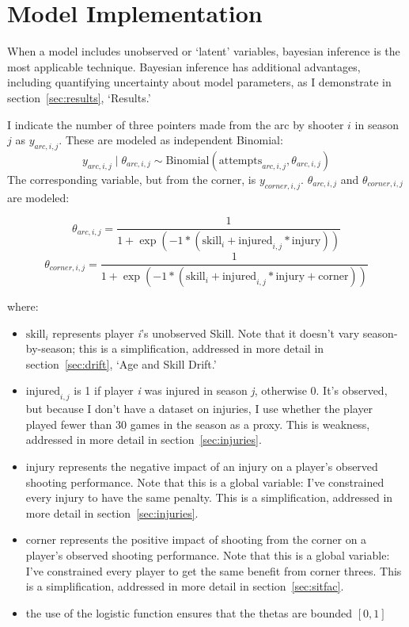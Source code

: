 \documentclass[11pt, oneside]{article}   	%
\begin{document}
\section{Model Implementation}
When a model includes unobserved or `latent' variables, bayesian inference is the most applicable technique.  Bayesian inference has additional advantages, including quantifying uncertainty about model parameters, as I demonstrate in section~\ref{sec:results}, `Results.' 

I indicate the number of three pointers made from the arc by shooter \(i\) in season \(j\) as \(y_{arc, i, j}\).  
These are modeled as independent Binomial:
\begin{displaymath}
y_{arc, i, j}  \mid  \theta_{arc, i, j} \sim \text{Binomial}(\text{attempts}_{arc, i, j},  \theta_{arc, i, j})
\end{displaymath} 
The corresponding variable, but from the corner, is \(y_{corner, i, j}\). \(\theta_{arc, i, j}\) and  \(\theta_{corner, i, j}\) are modeled:


\begin{displaymath}
\theta_{arc, i, j} = \frac{1}{1 + \exp(-1 * (\text{skill}_i + \text{injured}_{i,j}*\text{injury}))}
\end{displaymath} 
\begin{displaymath}
\theta_{corner, i, j} = \frac{1}{1 + \exp(-1 * (\text{skill}_i + \text{injured}_{i,j}*\text{injury} + \text{corner} ))}
\end{displaymath} 

where:
\begin{itemize}
\item \(\text{skill}_i\) represents player \textit{i}'s unobserved Skill.  Note that it doesn't vary season-by-season; this is a simplification, addressed in more detail in section~\ref{sec:drift}, `Age and Skill Drift.'
\item \(\text{injured}_{i,j}\) is 1 if player \textit{i} was injured in season \textit{j}, otherwise 0. It's observed, but because I don't have a dataset on injuries, I use whether the player played fewer than 30 games in the season as a proxy.  This is weakness, addressed in more detail in section~\ref{sec:injuries}.
\item injury represents the negative impact of an injury on a player's observed shooting performance.  Note that this is a global variable: I've constrained every injury to have the same penalty.  This is a simplification, addressed in more detail in section~\ref{sec:injuries}.  
\item corner represents the positive impact of shooting from the corner on a player's observed shooting performance. Note that this is a global variable: I've constrained every player to get the same benefit from corner threes.  This is a simplification, addressed in more detail in section~\ref{sec:sitfac}.  
\item the use of the logistic function ensures that the thetas are bounded \([0, 1]\)
\end{itemize} 
\end{document}
